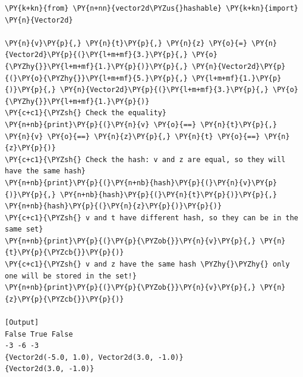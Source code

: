 \begin{Verbatim}[label=\makebox{\url{https://github.com/lucabaldini/cmepda/tree/master/slides/latex/snippets/vector2d\_hashable\_test.py}},commandchars=\\\{\}]
\PY{k+kn}{from} \PY{n+nn}{vector2d\PYZus{}hashable} \PY{k+kn}{import} \PY{n}{Vector2d}
     
\PY{n}{v}\PY{p}{,} \PY{n}{t}\PY{p}{,} \PY{n}{z} \PY{o}{=} \PY{n}{Vector2d}\PY{p}{(}\PY{l+m+mf}{3.}\PY{p}{,} \PY{o}{\PYZhy{}}\PY{l+m+mf}{1.}\PY{p}{)}\PY{p}{,} \PY{n}{Vector2d}\PY{p}{(}\PY{o}{\PYZhy{}}\PY{l+m+mf}{5.}\PY{p}{,} \PY{l+m+mf}{1.}\PY{p}{)}\PY{p}{,} \PY{n}{Vector2d}\PY{p}{(}\PY{l+m+mf}{3.}\PY{p}{,} \PY{o}{\PYZhy{}}\PY{l+m+mf}{1.}\PY{p}{)}
\PY{c+c1}{\PYZsh{} Check the equality}
\PY{n+nb}{print}\PY{p}{(}\PY{n}{v} \PY{o}{==} \PY{n}{t}\PY{p}{,} \PY{n}{v} \PY{o}{==} \PY{n}{z}\PY{p}{,} \PY{n}{t} \PY{o}{==} \PY{n}{z}\PY{p}{)}
\PY{c+c1}{\PYZsh{} Check the hash: v and z are equal, so they will have the same hash}
\PY{n+nb}{print}\PY{p}{(}\PY{n+nb}{hash}\PY{p}{(}\PY{n}{v}\PY{p}{)}\PY{p}{,} \PY{n+nb}{hash}\PY{p}{(}\PY{n}{t}\PY{p}{)}\PY{p}{,} \PY{n+nb}{hash}\PY{p}{(}\PY{n}{z}\PY{p}{)}\PY{p}{)}
\PY{c+c1}{\PYZsh{} v and t have different hash, so they can be in the same set}
\PY{n+nb}{print}\PY{p}{(}\PY{p}{\PYZob{}}\PY{n}{v}\PY{p}{,} \PY{n}{t}\PY{p}{\PYZcb{}}\PY{p}{)}
\PY{c+c1}{\PYZsh{} v and z have the same hash \PYZhy{}\PYZhy{} only one will be stored in the set!}
\PY{n+nb}{print}\PY{p}{(}\PY{p}{\PYZob{}}\PY{n}{v}\PY{p}{,} \PY{n}{z}\PY{p}{\PYZcb{}}\PY{p}{)}

[Output]
False True False
-3 -6 -3
{Vector2d(-5.0, 1.0), Vector2d(3.0, -1.0)}
{Vector2d(3.0, -1.0)}
\end{Verbatim}